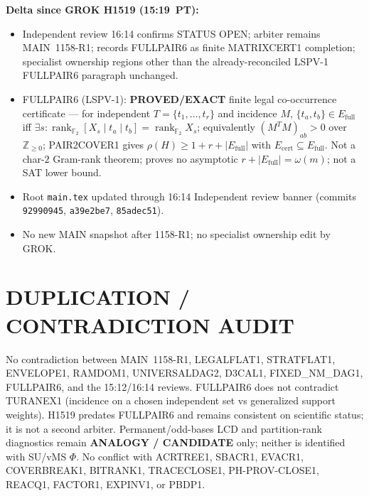 \documentclass[11pt]{article}
\begin{document}
\textbf{Delta since GROK H1519 (15:19~PT):}
\begin{itemize}
\item Independent review 16:14 confirms STATUS OPEN; arbiter remains MAIN~1158-R1;
records FULLPAIR6 as finite MATRIXCERT1 completion; specialist ownership regions
other than the already-reconciled LSPV-1 FULLPAIR6 paragraph unchanged.
\item FULLPAIR6 (LSPV-1): \textbf{PROVED/EXACT} finite legal co-occurrence
certificate --- for independent $T=\{t_1,\ldots,t_r\}$ and incidence $M$,
$\{t_a,t_b\}\in E_{\mathrm{full}}$ iff
$\exists s:\operatorname{rank}_{\mathbb F_2}[X_s\mid t_a\mid t_b]
=\operatorname{rank}_{\mathbb F_2}X_s$; equivalently $(M^TM)_{ab}>0$ over
$\mathbb Z_{\ge 0}$; PAIR2COVER1 gives $\rho(H)\ge 1+r+|E_{\mathrm{full}}|$ with
$E_{\mathrm{cert}}\subseteq E_{\mathrm{full}}$. Not a char-$2$ Gram-rank theorem;
proves no asymptotic $r+|E_{\mathrm{full}}|=\omega(m)$; not a SAT lower bound.
\item Root \texttt{main.tex} updated through 16:14 Independent review banner
(commits \texttt{92990945}, \texttt{a39e2be7}, \texttt{85adec51}).
\item No new MAIN snapshot after 1158-R1; no specialist ownership edit by GROK.
\end{itemize}

\section*{DUPLICATION / CONTRADICTION AUDIT}
No contradiction between MAIN~1158-R1, LEGALFLAT1, STRATFLAT1, ENVELOPE1, RAMDOM1,
UNIVERSALDAG2, D3CAL1, FIXED\_NM\_DAG1, FULLPAIR6, and the 15:12/16:14 reviews.
FULLPAIR6 does not contradict TURANEX1 (incidence on a chosen independent set vs
generalized support weights). H1519 predates FULLPAIR6 and remains consistent on
scientific status; it is not a second arbiter. Permanent/odd-bases LCD and
partition-rank diagnostics remain \textbf{ANALOGY / CANDIDATE} only; neither is
identified with SU/vMS $\Phi$. No conflict with ACRTREE1, SBACR1, EVACR1,
COVERBREAK1, BITRANK1, TRACECLOSE1, PH-PROV-CLOSE1, REACQ1, FACTOR1, EXPINV1, or
PBDP1.
\end{document}
